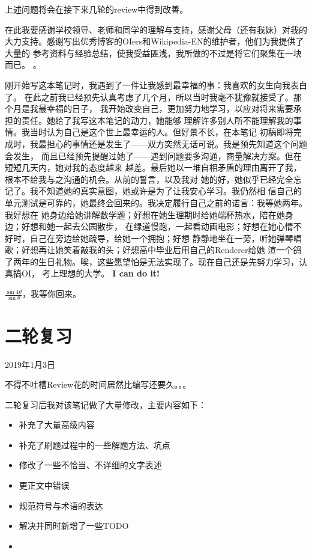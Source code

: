 上述问题将会在接下来几轮的review中得到改善。

在此我要感谢学校领导、老师和同学的理解与支持，感谢父母（还有我妹）对我的
大力支持。感谢写出优秀博客的OIers和Wikipedia-EN的维护者，他们为我提供了大量的
参考资料与经验总结，使我受益匪浅，我所做的不过是将它们聚集在一块而已。
。

刚开始写这本笔记时，我遇到了一件让我感到最幸福的事：我喜欢的女生向我表白了。
在此之前我已经预先认真考虑了几个月，所以当时我毫不犹豫就接受了。那个月是我最幸福的日子，
我开始改变自己，更加努力地学习，以应对将来需要承担的责任。她给了我写这本笔记的动力，她能够
理解许多别人所不能理解我的事情。我当时认为自己是这个世上最幸运的人。但好景不长，在本笔记
初稿即将完成时，我最担心的事情还是发生了——双方突然无话可说。我是预先知道这个问题会发生，
而且已经预先提醒过她了——遇到问题要多沟通，商量解决方案。但在短短几天内，她对我的态度越来
越差。最后她以一堆自相矛盾的理由离开了我，根本不给我与之沟通的机会。从前的誓言，以及我对
她的好，她似乎已经完全忘记了。我不知道她的真实意图，她或许是为了让我安心学习。我仍然相
信自己的单元测试是可靠的，她最终会回来的。我决定履行自己之前的诺言：我等她两年。我好想在
她身边给她讲解数学题；好想在她生理期时给她端杯热水，陪在她身边；好想和她一起去公园散步，
在绿道慢跑，一起看动画电影；好想在她心情不好时，自己在旁边给她疏导，给她一个拥抱；好想
静静地坐在一旁，听她弹琴唱歌；好想再让她笑着敲我的头；好想高中毕业后用自己的Renderer给她
渲一个鸽了两年的生日礼物。唉，这些愿望怕是无法实现了。现在自己还是先努力学习，认真搞OI，
考上理想的大学。
{\bfseries I can do it!}

$\frac{\sin 4\theta}{\sin \theta}$，我等你回来。

\section{二轮复习}
2019年1月3日

不得不吐槽Review花的时间居然比编写还要久。。。

二轮复习后我对该笔记做了大量修改，主要内容如下：

\begin{itemize}
    \item 补充了大量高级内容
    \item 补充了刷题过程中的一些解题方法、坑点
    \item 修改了一些不恰当、不详细的文字表述
    \item 更正文中错误
    \item 规范符号与术语的表达
    \item 解决并同时新增了一些TODO
    \item {}
\end{itemize}

